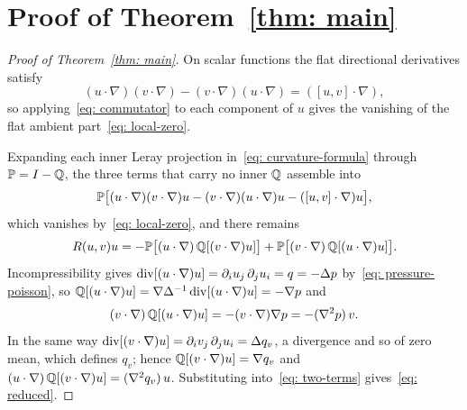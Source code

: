 \section{Proof of Theorem~\ref{thm: main}}
\label{sec: proof}

\begin{proof}[Proof of Theorem~\ref{thm: main}]
On scalar functions the flat directional derivatives satisfy
\begin{equation}\label{eq: commutator}
  (u\cdot\nabla)(v\cdot\nabla) - (v\cdot\nabla)(u\cdot\nabla)
  = ([u,v]\cdot\nabla),
\end{equation}
so applying~\eqref{eq: commutator} to each component of $u$ gives the vanishing of
the flat ambient part~\eqref{eq: local-zero}.

Expanding each inner Leray projection in~\eqref{eq: curvature-formula} through
$\mathbb{P} = I - \mathbb{Q}$, the three terms that carry no inner $\mathbb{Q}$ assemble into
\[
  \mathbb{P}\bigl[(u\cdot\nabla)(v\cdot\nabla)u - (v\cdot\nabla)(u\cdot\nabla)u
              - ([u,v]\cdot\nabla)u\bigr],
\]
which vanishes by~\eqref{eq: local-zero}, and there remains
\begin{equation}\label{eq: two-terms}
  R(u,v)u = -\mathbb{P}\bigl[(u\cdot\nabla)\,\mathbb{Q}[(v\cdot\nabla)u]\bigr]
              + \mathbb{P}\bigl[(v\cdot\nabla)\,\mathbb{Q}[(u\cdot\nabla)u]\bigr].
\end{equation}
Incompressibility gives $\operatorname{div}[(u\cdot\nabla)u] = \partial_i u_j\,\partial_j u_i
= q = -\Delta p$ by~\eqref{eq: pressure-poisson}, so
$\mathbb{Q}[(u\cdot\nabla)u] = \nabla\Delta^{-1}\operatorname{div}[(u\cdot\nabla)u] = -\nabla p$ and
\[
  (v\cdot\nabla)\,\mathbb{Q}[(u\cdot\nabla)u] = -(v\cdot\nabla)\nabla p
  = -(\nabla^2 p)\,v.
\]
In the same way $\operatorname{div}[(v\cdot\nabla)u] = \partial_i v_j\,\partial_j u_i
= \Delta q_v$, a divergence and so of zero mean, which defines $q_v$; hence
$\mathbb{Q}[(v\cdot\nabla)u] = \nabla q_v$ and
$(u\cdot\nabla)\,\mathbb{Q}[(v\cdot\nabla)u] = (\nabla^2 q_v)\,u$. Substituting
into~\eqref{eq: two-terms} gives~\eqref{eq: reduced}.
\end{proof}

